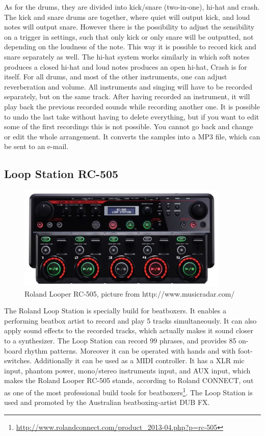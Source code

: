 As for the drums, they are divided into kick/snare (two-in-one), hi-hat and crash. The kick and snare drums are together, where quiet will output kick, and loud notes will output snare. However there is the possibility to adjust the sensibility on a trigger in settings, such that only kick or only snare will be outputted, not depending on the loudness of the note. This way it is possible to record kick and snare separately as well. The hi-hat system works similarly in which soft notes produces a closed hi-hat and loud notes produces an open hi-hat, Crash is for itself. For all drums, and most of the other instruments, one can adjust reverberation and volume. 
All instruments and singing will have to be recorded separately, but on the same track. After having recorded an instrument, it will play back the previous recorded sounds while recording another one. It is possible to undo the last take without having to delete everything, but if you want to edit some of the first recordings this is not possible.  You cannot go back and change or edit the whole arrangement. It converts the samples into a MP3 file, which can be sent to an e-mail. 

\subsection{ Loop Station RC-505 }
\label{loopstation}
\begin{figure}[h]
	\begin{center}
		\includegraphics[height=5cm]{fig/Roland-RC-505.JPG}
		\caption{Roland Looper RC-505, picture from http://www.musicradar.com/}
		\label{Looper}
	\end{center}
\end{figure}
The Roland Loop Station is specially build for beatboxers. It enables a performing beatbox artist to record and play 5 tracks simultaneously. It can also apply sound effects to the recorded tracks, which actually makes it sound closer to a synthesizer. The Loop Station can record 99 phrases, and provides 85 on-board rhythm patterns. Moreover it can be operated with hands and with foot-switches. Additionally it can be used as a MIDI controller. It has a XLR mic input, phantom power, mono/stereo instruments input, and AUX input, which makes the Roland Looper RC-505 stands, according to Roland CONNECT, out as one of the most professional build tools for beatboxers\footnote{\url{http://www.rolandconnect.com/product_2013-04.php?p=rc-505}}.
The Loop Station is used and promoted by the Australian beatboxing-artist DUB FX.


